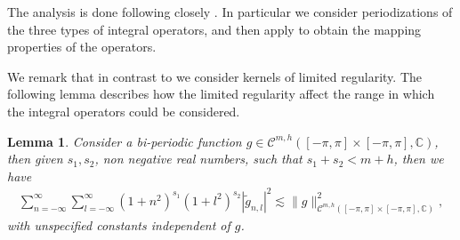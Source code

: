 \documentclass{article}
\newtheorem{lemma}[theorem]{Lemma}
\newcommand{\IC}{{\mathbb C}}
\newcommand{\cmspaceh}[4]{\mathcal{C}^{#1,#2} \left( #3, #4 \right)}
\begin{document}
The analysis is done following closely \cite[Chapters 6 and 11]{saranen2013periodic}. In particular we consider periodizations of the three types of integral operators, and then apply \cite[Theorem 6.1.1]{saranen2013periodic} to obtain the mapping properties of the operators. 

We remark that in contrast to \cite[Chapter 6]{saranen2013periodic}  we consider kernels of limited regularity. The following lemma describes how the limited regularity affect the range in which the integral operators could be considered.  

\begin{lemma}
\label{lemma:cmdecay2}
Consider a bi-periodic function $g \in \cmspaceh{m}{h}{[-\pi,\pi]\times[-\pi,\pi]}{\IC}$, then given $s_1, s_2$, non negative real numbers, such that $s_1+s_2 < m+h$, then we have 
\begin{align*}
\sum_{n=-\infty}^{\infty}\sum_{l=-\infty}^{\infty}
(1+n^2)^{s_1} (1+l^2)^{s_2} |\widetilde{g}_{n,l}|^2 \lesssim \|g\|^2_{\cmspaceh{m}{h}{[-\pi,\pi]\times[-\pi,\pi]}{\IC}},
\end{align*}
with unspecified constants independent of $g$. 
\end{lemma}
\end{document}
